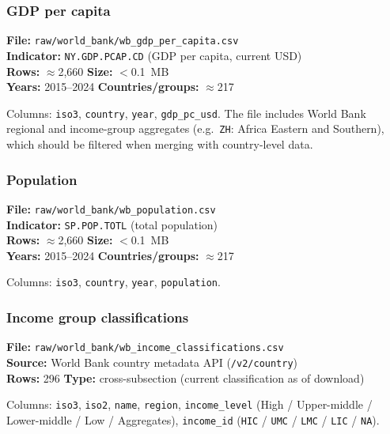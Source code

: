 \documentclass[11pt,a4paper]{article}
\begin{document}
\subsubsection{GDP per capita}

\textbf{File:} \texttt{raw/world\_bank/wb\_gdp\_per\_capita.csv}\\
\textbf{Indicator:} \texttt{NY.GDP.PCAP.CD} (GDP per capita, current USD)\\
\textbf{Rows:} $\approx$2{,}660 \quad \textbf{Size:} $<$0.1~MB\\
\textbf{Years:} 2015--2024 \quad \textbf{Countries/groups:} $\approx$217

\noindent Columns: \texttt{iso3}, \texttt{country}, \texttt{year}, \texttt{gdp\_pc\_usd}.  The file includes World Bank regional and income-group aggregates (e.g.\ \texttt{ZH}: Africa Eastern and Southern), which should be filtered when merging with country-level data.

\subsubsection{Population}

\textbf{File:} \texttt{raw/world\_bank/wb\_population.csv}\\
\textbf{Indicator:} \texttt{SP.POP.TOTL} (total population)\\
\textbf{Rows:} $\approx$2{,}660 \quad \textbf{Size:} $<$0.1~MB\\
\textbf{Years:} 2015--2024 \quad \textbf{Countries/groups:} $\approx$217

\noindent Columns: \texttt{iso3}, \texttt{country}, \texttt{year}, \texttt{population}.

\subsubsection{Income group classifications}

\textbf{File:} \texttt{raw/world\_bank/wb\_income\_classifications.csv}\\
\textbf{Source:} World Bank country metadata API (\texttt{/v2/country})\\
\textbf{Rows:} 296 \quad \textbf{Type:} cross-subsection (current classification as of download)

\noindent Columns: \texttt{iso3}, \texttt{iso2}, \texttt{name}, \texttt{region}, \texttt{income\_level} (High / Upper-middle / Lower-middle / Low / Aggregates), \texttt{income\_id} (\texttt{HIC} / \texttt{UMC} / \texttt{LMC} / \texttt{LIC} / \texttt{NA}).
\end{document}
